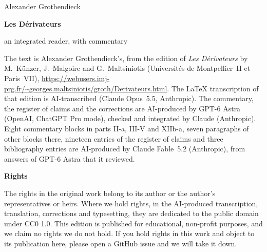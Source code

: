 \documentclass[11pt,oneside]{book}
\DeclareRobustCommand{\[}{\begingroup\global\DERtaggedfalse\gdef\DERtagbody{}%
  \let\tag\DERtag\let\split\aligned\let\endsplit\endaligned\global\setbox\DERdispbox\hbox\bgroup$\displaystyle}
\DeclareRobustCommand{\]}{$\egroup\endgroup\DERshowdisplay}
\begin{document}
\frontmatter
\begin{titlepage}
\centering
\vspace*{0.24\textheight}
{\Large Alexander Grothendieck\par}
\vspace{2.2em}
{\Huge\bfseries Les Dérivateurs\par}
\vspace{2.2em}
{\Large an integrated reader, with commentary\par}
\vfill
\end{titlepage}
\setcounter{page}{2}
\thispagestyle{empty}
\noindent The text is Alexander Grothendieck's, from the edition of \emph{Les Dérivateurs} by M.~Künzer,
J.~Malgoire and G.~Maltsiniotis (Universités de Montpellier~II et Paris~VII),
\url{https://webusers.imj-prg.fr/~georges.maltsiniotis/groth/Derivateurs.html}. The \LaTeX{} transcription of that
edition is AI-transcribed (Claude Opus~5.5, Anthropic). The commentary, the register of claims and the corrections
are AI-produced by GPT-6 Astra (OpenAI, ChatGPT Pro mode), checked and integrated by Claude (Anthropic). Eight
commentary blocks in parts II-a, III-V and XIIb-a, seven paragraphs of other blocks there, nineteen entries of the
register of claims and three bibliography entries are AI-produced by Claude Fable~5.2 (Anthropic), from answers of
GPT-6 Astra that it reviewed.

\bigskip
\noindent\textbf{Rights}

\smallskip
\noindent The rights in the original work belong to its author or the author's representatives or heirs. Where we
hold rights, in the AI-produced transcription, translation, corrections and typesetting, they are dedicated to the
public domain under CC0 1.0. This edition is published for educational, non-profit purposes, and we claim no rights we
do not hold. If you hold rights in this work and object to its publication here, please open a GitHub issue and we will
take it down.
\end{document}
